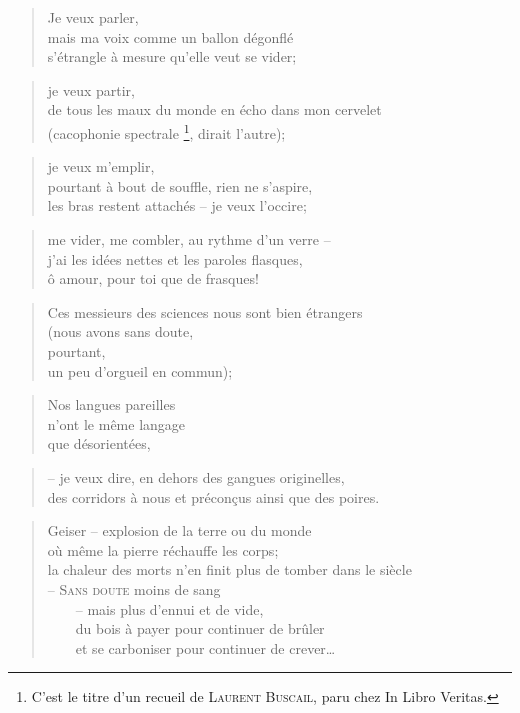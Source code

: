   \begin{verse}
    Je veux parler,\\
    mais ma voix comme un ballon dégonflé\\
    s’étrangle à mesure qu’elle veut se vider;
  \end{verse}
  \begin{verse}
    je veux partir,\\
    de tous les maux du monde en écho dans mon cervelet\\
    (cacophonie spectrale
      \footnote
      {
	C’est le titre d’un recueil de \textsc{Laurent Buscail}, paru chez In Libro Veritas.
      }, dirait l’autre);
  \end{verse}
  \begin{verse}
    je veux m’emplir,\\
    pourtant à bout de souffle, rien ne s’aspire,\\
    les bras restent attachés -- je veux l’occire;
  \end{verse}
  \begin{verse}
    me vider, me combler, au rythme d’un verre --\\
    j’ai les idées nettes et les paroles flasques,\\
    ô amour, pour toi que de frasques!
  \end{verse}
  \begin{verse}
    Ces messieurs des sciences nous sont bien étrangers\\
    (nous avons sans doute,\\
    pourtant,\\
    un peu d’orgueil en commun);
  \end{verse}
  \begin{verse}
    Nos langues pareilles\\
    n’ont le même langage\\
    que désorientées,
  \end{verse}
  \begin{verse}
    -- je veux dire, en dehors des gangues originelles,\\
    des corridors à nous et préconçus ainsi que des poires.
  \end{verse}
  \begin{verse}
    Geiser -- explosion de la terre ou du monde\\
    où même la pierre réchauffe les corps;\\
    la chaleur des morts n’en finit plus de tomber dans le siècle\\
    -- \textsc{Sans doute} moins de sang\\
    ~~~~-- mais plus d’ennui et de vide,\\
    ~~~~du bois à payer pour continuer de brûler\\
    ~~~~et se carboniser pour continuer de crever…
  \end{verse}

